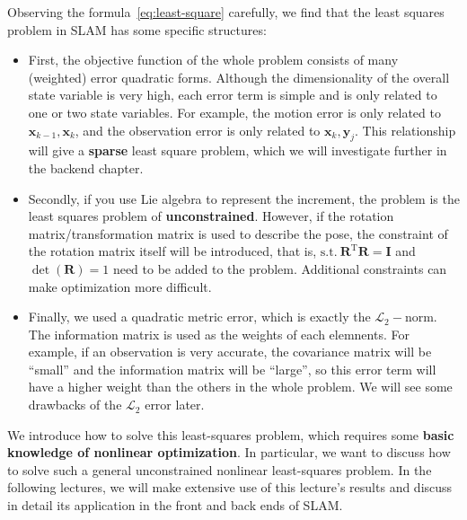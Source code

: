 Observing the formula~\eqref{eq:least-square} carefully, we find that the least squares problem in SLAM has some specific structures:

\begin{itemize}
	\item First, the objective function of the whole problem consists of many (weighted) error quadratic forms. Although the dimensionality of the overall state variable is very high, each error term is simple and is only related to one or two state variables. For example, the motion error is only related to $\bm{x}_{k-1}, \bm{x}_k$, and the observation error is only related to $\bm{x}_k, \bm{y}_j$. This relationship will give a \textbf{sparse} least square problem, which we will investigate further in the backend chapter.

	\item Secondly, if you use Lie algebra to represent the increment, the problem is the least squares problem of \textbf{unconstrained}. However, if the rotation matrix/transformation matrix is ​​used to describe the pose, the constraint of the rotation matrix itself will be introduced, that is, $\mathrm{s.t.}\ \bm{R}^\mathrm{T} \bm{R} = \bm{I}$ and $\det (\bm{R})=1$ need to be added to the problem. Additional constraints can make optimization more difficult.

	\item Finally, we used a quadratic metric error, which is exactly the $\mathcal{L}_2-$norm. The information matrix is used as the weights of each elemnents. For example, if an observation is very accurate, the covariance matrix will be ``small'' and the information matrix will be ``large'', so this error term will have a higher weight than the others in the whole problem. We will see some drawbacks of the $\mathcal{L}_2$ error later.
\end{itemize}

We introduce how to solve this least-squares problem, which requires some \textbf{basic knowledge of nonlinear optimization}. In particular, we want to discuss how to solve such a general unconstrained nonlinear least-squares problem. In the following lectures, we will make extensive use of this lecture's results and discuss in detail its application in the front and back ends of SLAM\@.

